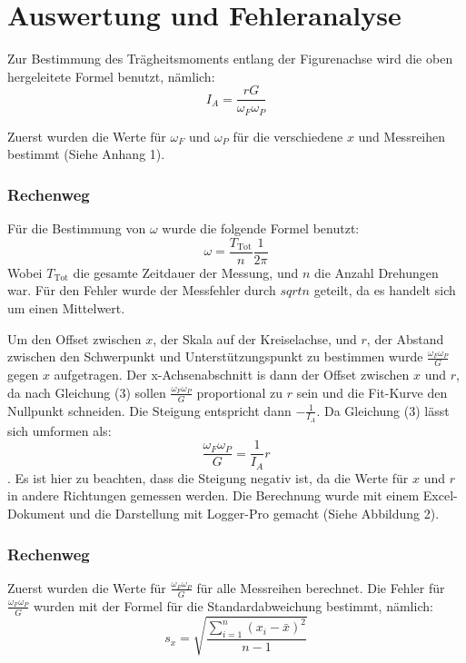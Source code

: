 \documentclass[11pt,a4paper]{article} %
\begin{document}
\section{Auswertung und Fehleranalyse}
Zur Bestimmung des Trägheitsmoments entlang der Figurenachse wird die oben hergeleitete Formel benutzt, nämlich:
$$I_A = \frac{rG}{\omega_F \omega_P}$$

Zuerst wurden die Werte für $\omega_F$ und $\omega_P$ für die verschiedene $x$ und Messreihen bestimmt (Siehe Anhang 1). 
\begin{tcolorbox}[colback=white]
\subsubsection{Rechenweg}
Für die Bestimmung von $\omega$ wurde die folgende Formel benutzt:
$$ \omega = \frac{T_\textrm{Tot}}{n}\frac{1}{2\pi}$$
Wobei $T_\textrm{Tot}$ die gesamte Zeitdauer der Messung, und $n$ die Anzahl Drehungen war.
Für den Fehler wurde der Messfehler durch $sqrt{n}$ geteilt, da es handelt sich um einen Mittelwert.
\end{tcolorbox}

Um den Offset zwischen $x$, der Skala auf der Kreiselachse, und $r$, der Abstand zwischen den Schwerpunkt und Unterstützungspunkt zu bestimmen wurde $\frac{\omega_F\omega_P}{G}$ gegen $x$ aufgetragen. Der x-Achsenabschnitt is dann der Offset zwischen $x$ und $r$, da nach Gleichung (3) sollen $\frac{\omega_F\omega_P}{G}$ proportional zu $r$ sein und die Fit-Kurve den Nullpunkt schneiden. Die Steigung entspricht dann $-\frac{1}{I_A}$. Da Gleichung (3) lässt sich umformen als:
$$ \frac{\omega_F\omega_P}{G}  = \frac{1}{I_A} r$$. Es ist hier zu beachten, dass die Steigung negativ ist, da die Werte für $x$ und $r$ in andere Richtungen gemessen werden. Die Berechnung wurde mit einem Excel-Dokument und die Darstellung mit Logger-Pro gemacht (Siehe Abbildung 2).


\begin{tcolorbox}[colback=white] 
\subsubsection{Rechenweg}
Zuerst wurden die Werte für $\frac{\omega_F\omega_P}{G}$ für alle Messreihen berechnet. Die Fehler für $\frac{\omega_F\omega_P}{G}$ wurden mit der Formel für die Standardabweichung bestimmt, nämlich:
$$s_x = \sqrt{\frac{\sum_{i=1}^{n}(x_i-\bar{x})^2}{n-1}} $$
\end{tcolorbox}
\end{document}
